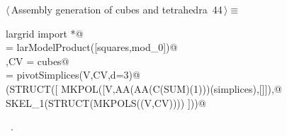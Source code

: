 \documentclass[11pt,oneside]{article}	%
\begin{document}
\begin{flushleft} \small \label{scrap95}
\protect{}$\langle\,$Assembly generation of cubes and tetrahedra\nobreak\ {\footnotesize 44}$\,\rangle\equiv$
\vspace{-1ex}
\begin{list}{}{} \item
\mbox{}\verb@from largrid import *@\\
\mbox{}\verb@cubes = larModelProduct([squares,mod_0])@\\
\mbox{}\verb@V,CV = cubes@\\
\mbox{}\verb@simplices = pivotSimplices(V,CV,d=3)@\\
\mbox{}\verb@VIEW(STRUCT([ MKPOL([V,AA(AA(C(SUM)(1)))(simplices),[]]),@\\
\mbox{}\verb@           SKEL_1(STRUCT(MKPOLS((V,CV)))) ]))@\\
\mbox{}\verb@@{\NWsep}
\end{list}
\vspace{-1ex}
\footnotesize\addtolength{\baselineskip}{-1ex}
\begin{list}{}{\setlength{\itemsep}{-\parsep}\setlength{\itemindent}{-\leftmargin}}
\item \NWtxtMacroRefIn\ .
\end{list}
\end{flushleft}









\end{document}
